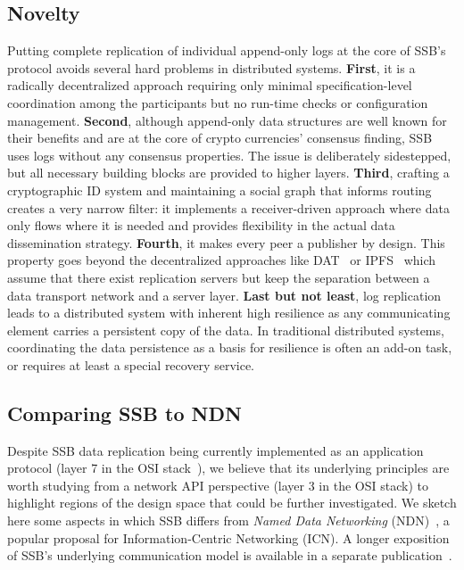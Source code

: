 \documentclass[9pt,sigconf]{acmart}
\begin{document}
\subsection*{Novelty}

Putting complete replication of individual append-only logs at the
core of SSB's protocol avoids several hard problems in distributed
systems. {\bf First}, it is a radically decentralized approach
requiring only minimal specification-level coordination among the
participants but no run-time checks or configuration management.
%
{\bf Second}, although append-only data structures are well known for
their benefits and are at the core of crypto currencies' consensus
finding, SSB uses logs without any consensus properties. The issue is
deliberately sidestepped, but all necessary building blocks are
provided to higher layers.
%
{\bf Third}, crafting a cryptographic ID system and maintaining a
social graph that informs routing creates a very narrow filter: it
implements a receiver-driven approach where data only flows where it
is needed and provides flexibility in the actual data dissemination
strategy.
%
{\bf Fourth}, it makes every peer a publisher by design. This property
goes beyond the decentralized approaches like DAT~\cite{datproject} or
IPFS~\cite{benet2014ipfs} which assume that there exist replication
servers but keep the separation between a data transport network and a
server layer.
%
{\bf Last but not least}, log replication leads to a distributed
system with inherent high resilience as any communicating element
carries a persistent copy of the data. In traditional distributed
systems, coordinating the data persistence as a basis for resilience
is often an add-on task, or requires at least a special recovery
service.

\subsection*{Comparing SSB to NDN}

Despite SSB data replication being currently implemented as an
application protocol (layer 7 in the OSI
stack~\cite{briscoe2000understanding}), we believe that its underlying
principles are worth studying from a network API perspective (layer 3
in the OSI stack) to highlight regions of the design space that could
be further investigated. We sketch here some aspects in which SSB
differs from \textit{Named Data Networking}
(NDN)~\cite{ahlgren2012survey}, a popular proposal for
Information-Centric Networking (ICN). A longer exposition of SSB's
underlying communication model is available in a separate
publication~\cite{tschudin2019broadcast}.
\end{document}
